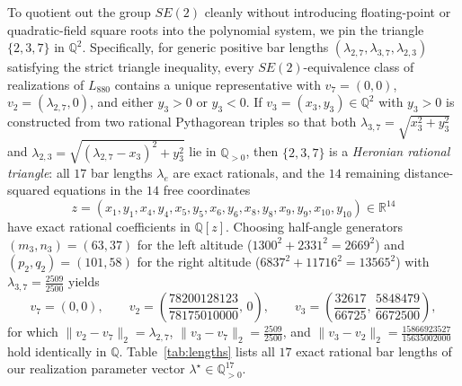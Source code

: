 \documentclass[11pt,a4paper]{article}
\theoremstyle{definition}
\theoremstyle{remark}
\begin{document}
To quotient out the group $SE(2)$ cleanly without introducing floating-point or quadratic-field square roots into the polynomial system, we pin the triangle $\{2,3,7\}$ in $\mathbb{Q}^2$. Specifically, for generic positive bar lengths $(\lambda_{2,7}, \lambda_{3,7}, \lambda_{2,3})$ satisfying the strict triangle inequality, every $SE(2)$-equivalence class of realizations of $L_{880}$ contains a unique representative with $v_7 = (0,0)$, $v_2 = (\lambda_{2,7}, 0)$, and either $y_3 > 0$ or $y_3 < 0$. If $v_3 = (x_3, y_3) \in \mathbb{Q}^2$ with $y_3 > 0$ is constructed from two rational Pythagorean triples so that both $\lambda_{3,7} = \sqrt{x_3^2 + y_3^2}$ and $\lambda_{2,3} = \sqrt{(\lambda_{2,7} - x_3)^2 + y_3^2}$ lie in $\mathbb{Q}_{>0}$, then $\{2,3,7\}$ is a \emph{Heronian rational triangle}: all $17$ bar lengths $\lambda_e$ are exact rationals, and the $14$ remaining distance-squared equations in the $14$ free coordinates
\[
z = (x_1, y_1, x_4, y_4, x_5, y_5, x_6, y_6, x_8, y_8, x_9, y_9, x_{10}, y_{10}) \in \mathbb{R}^{14}
\]
have exact rational coefficients in $\mathbb{Q}[z]$. Choosing half-angle generators $(m_3, n_3) = (63, 37)$ for the left altitude ($1300^2 + 2331^2 = 2669^2$) and $(p_2, q_2) = (101, 58)$ for the right altitude ($6837^2 + 11716^2 = 13565^2$) with $\lambda_{3,7} = \frac{2509}{2500}$ yields
\begin{equation}\label{eq:heronian}
v_7 = (0, 0), \qquad
v_2 = \left(\frac{78200128123}{78175010000},\, 0\right), \qquad
v_3 = \left(\frac{32617}{66725},\, \frac{5848479}{6672500}\right),
\end{equation}
for which $\|v_2 - v_7\|_2 = \lambda_{2,7}$, $\|v_3 - v_7\|_2 = \frac{2509}{2500}$, and $\|v_3 - v_2\|_2 = \frac{15866923527}{15635002000}$ hold identically in $\mathbb{Q}$. Table~\ref{tab:lengths} lists all $17$ exact rational bar lengths of our realization parameter vector $\lambda^\star \in \mathbb{Q}_{>0}^{17}$.
\end{document}

